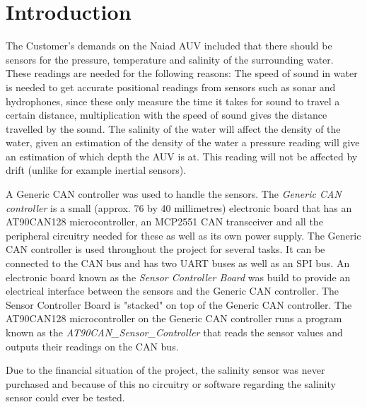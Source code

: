 
\section{Introduction}\label{sec:introduction}
The Customer's demands on the Naiad AUV included that there should be sensors for the pressure, temperature and salinity of the surrounding water. These readings are needed for the following reasons: \newline
The speed of sound in water is needed to get accurate positional readings from sensors such as sonar and hydrophones, since these only measure the time it takes for sound to travel a certain distance, multiplication with the speed of sound gives the distance travelled by the sound. \newline
The salinity of the water will affect the density of the water, given an estimation of the density of the water a pressure reading will give an estimation of which depth the AUV is at. This reading will not be affected by drift (unlike for example inertial sensors).

A Generic CAN controller was used to handle the sensors. The \emph{Generic CAN controller} is a small (approx. 76 by 40 millimetres) electronic board that has an AT90CAN128 microcontroller, an MCP2551 CAN transceiver and all the peripheral circuitry needed for these as well as its own power supply. The Generic CAN controller is used throughout the project for several tasks. It can be connected to the CAN bus and has two UART buses as well as an SPI bus. \newline
An electronic board known as the \emph{Sensor Controller Board} was build to provide an electrical interface between the sensors and the Generic CAN controller. The Sensor Controller Board is "stacked" on top of the Generic CAN controller. \newline
The AT90CAN128 microcontroller on the Generic CAN controller runs a program known as the \newline
\emph{AT90CAN\_Sensor\_Controller} that reads the sensor values and outputs their readings on the CAN bus.

Due to the financial situation of the project, the salinity sensor was never purchased and because of this no circuitry or software regarding  the salinity sensor could ever be tested. 

